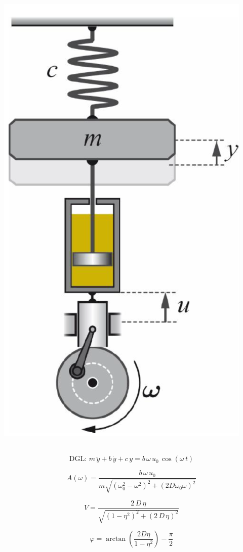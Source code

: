 \begin{minipage}{0.25\linewidth}
\includegraphics[width=0.9\linewidth]{Bilder/Wellen-Optik/daempfererregung} \\
\\
\end{minipage}
\hfill
\begin{minipage}{0.72\linewidth}
$$ \boxed{ \text{DGL: } m \, \ddot{y} + b \, \dot{y} + c \, y = b \, \omega  \, u_0 \, \cos(\omega \, t)  } $$  

$$ A(\omega) =  \frac{b \, \omega \, u_0}{m\sqrt{(\omega_0^2 -\omega^2)^2 + (2D \omega_0 \omega)^2}} $$ 

$$ \boxed{ V = \frac{2 \, D \, \eta}{\sqrt{(1- \eta^2)^2 + (2 \, D \, \eta)^2} } } $$

$$ \boxed{ \varphi = \arctan \left( \frac{2 D \eta}{1 - \eta^2} \right) - \frac{\pi}{2} } $$ 


\end{minipage}


